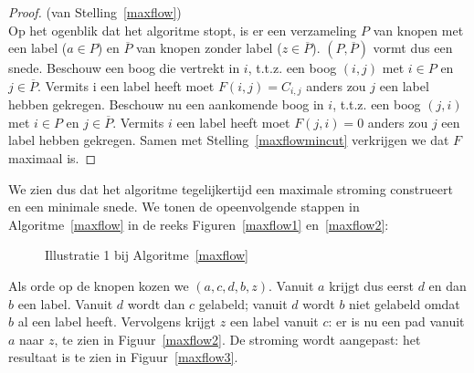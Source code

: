 \begin{proof} (van Stelling~\ref{maxflow})\\
Op het ogenblik dat het algoritme stopt, is er een verzameling $P$ van
knopen met een label ($a \in P$) en $\overline{P}$ van knopen zonder label 
($z \in \overline{P}$). $(P,\overline{P})$ vormt dus een snede. 
Beschouw een boog die
vertrekt in $i$, t.t.z. een boog $(i,j)$ met $i \in P$ en $j \in \overline{P}$.
Vermits i een label heeft moet $F(i,j) = C_{i,j}$ anders zou $j$ een
label hebben gekregen. Beschouw nu een aankomende boog in $i$, t.t.z.
een boog $(j,i)$ met $i \in P$ en $j \in \overline{P}$. Vermits $i$ een label
heeft moet $F(j,i) = 0$ anders zou $j$ een label hebben gekregen. Samen
met Stelling~\ref{maxflowmincut} verkrijgen we dat $F$ maximaal is.
\end{proof}



We zien dus dat het algoritme tegelijkertijd een maximale stroming
construeert en een minimale snede. We tonen de opeenvolgende stappen
in Algoritme~\ref{maxflow} in de reeks Figuren~\ref{maxflow1} en~\ref{maxflow2}:

\begin{figure}[ht]
\begin{center}
 \hspace{1cm}
\end{center}
\caption{Illustratie 1 bij Algoritme~\ref{maxflow}}
\end{figure}

Als orde op de knopen kozen we $(a,c,d,b,z)$. Vanuit $a$ krijgt dus eerst
$d$ en dan $b$ een label. Vanuit $d$ wordt dan $c$ gelabeld; vanuit $d$ wordt 
$b$ niet gelabeld omdat $b$ al een label heeft. Vervolgens  krijgt $z$
een label vanuit $c$: er is nu een pad vanuit $a$ naar $z$, te zien in
Figuur~\ref{maxflow2}. De stroming wordt aangepast: het resultaat is
te zien in Figuur~\ref{maxflow3}.

